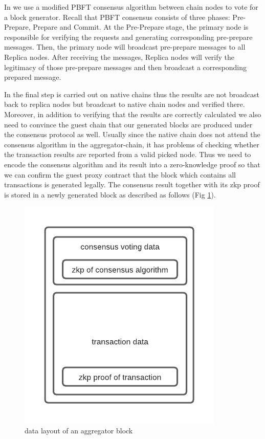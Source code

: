 \documentclass[pageno]{jpaper}
\begin{document}
In \dprotocol we use a modified PBFT \cite{castro1999practical} consensus algorithm between chain nodes to vote for a block generator. Recall that PBFT consensus consists of three phases: Pre-Prepare, Prepare and Commit. At the Pre-Prepare stage, the primary node is responsible for verifying the requests and generating corresponding pre-prepare messages. Then, the primary node will broadcast pre-prepare messages to all Replica nodes. After receiving the messages, Replica nodes will verify the legitimacy of those pre-prepare messages and then broadcast a corresponding prepared message.

In \dprotocol the final step is carried out on native chains thus the results are not broadcast back to replica nodes but broadcast to native chain nodes and verified there. Moreover, in addition to verifying that the results are correctly calculated we also need to convince the guest chain that our generated blocks are produced under the consensus protocol as well. Usually since the native chain does not attend the consensus algorithm in the aggregator-chain, it has problems of checking whether the transaction results are reported from a valid picked node. Thus we need to encode the consensus algorithm and its result into a zero-knowledge proof so that we can confirm the guest proxy contract that the block which contains all transactions is generated legally. The consensus result together with its zkp proof is stored in a newly generated block as described as follows (Fig \ref{block-layout}). 

\begin{figure}[!ht]
\begin{center}
\includegraphics[scale=0.5]{block-data-layout}
\end{center}
\caption{data layout of an aggregator block}
\label{block-layout}
\end{figure}
\end{document}
